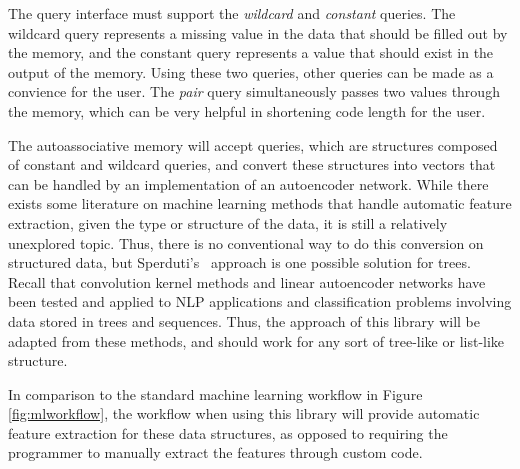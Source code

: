 \documentclass{sig-alternate}
\begin{document}
The query interface must support the \textit{wildcard} and \textit{constant} queries. The wildcard
query represents a missing value in the data that should be filled out by the memory, and the constant
query represents a value that should exist in the output of the memory. Using these two queries,
other queries can be made as a convience for the user. The \textit{pair} query simultaneously
passes two values through the memory, which can be very helpful in shortening code length for the user.

The autoassociative memory will accept queries, which are structures composed of constant and wildcard queries,
and convert these structures into vectors that can be handled by an implementation of an autoencoder
network. While there exists some literature on machine learning methods that handle automatic feature 
extraction, given the type or structure of the data, it is still a relatively unexplored topic. Thus, there is no conventional way to do this conversion on structured data, but
Sperduti's~\cite{sperduti} approach is one possible solution for trees.
Recall that convolution kernel methods and 
linear autoencoder networks have been tested and applied to NLP applications and classification problems involving data 
stored in trees and sequences. Thus, the approach of this library will be adapted from these methods, and should work for any sort 
of tree-like or list-like structure.



In comparison to the standard machine learning workflow in Figure \ref{fig:mlworkflow}, the workflow
when using this library will provide automatic feature extraction for these data structures, as opposed to
requiring the programmer to manually extract the features through custom code.

\end{document}
